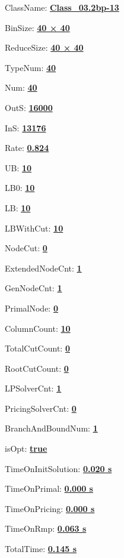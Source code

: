 \documentclass[11pt]{article}
\begin{document}
\pagestyle{empty}


ClassName: \underline{\textbf{Class_03.2bp-13}}
\par
BinSize: \underline{\textbf{40 × 40}}
\par
ReduceSize: \underline{\textbf{40 × 40}}
\par
TypeNum: \underline{\textbf{40}}
\par
Num: \underline{\textbf{40}}
\par
OutS: \underline{\textbf{16000}}
\par
InS: \underline{\textbf{13176}}
\par
Rate: \underline{\textbf{0.824}}
\par
UB: \underline{\textbf{10}}
\par
LB0: \underline{\textbf{10}}
\par
LB: \underline{\textbf{10}}
\par
LBWithCut: \underline{\textbf{10}}
\par
NodeCut: \underline{\textbf{0}}
\par
ExtendedNodeCnt: \underline{\textbf{1}}
\par
GenNodeCnt: \underline{\textbf{1}}
\par
PrimalNode: \underline{\textbf{0}}
\par
ColumnCount: \underline{\textbf{10}}
\par
TotalCutCount: \underline{\textbf{0}}
\par
RootCutCount: \underline{\textbf{0}}
\par
LPSolverCnt: \underline{\textbf{1}}
\par
PricingSolverCnt: \underline{\textbf{0}}
\par
BranchAndBoundNum: \underline{\textbf{1}}
\par
isOpt: \underline{\textbf{true}}
\par
TimeOnInitSolution: \underline{\textbf{0.020 s}}
\par
TimeOnPrimal: \underline{\textbf{0.000 s}}
\par
TimeOnPricing: \underline{\textbf{0.000 s}}
\par
TimeOnRmp: \underline{\textbf{0.063 s}}
\par
TotalTime: \underline{\textbf{0.145 s}}
\par
\newpage


\end{document}
